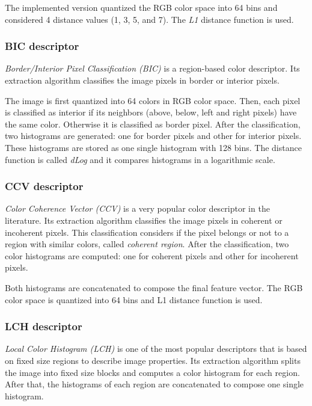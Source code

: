 The implemented version quantized the RGB color space into 64 bins and considered 4 distance values (1, 3, 5, and 7). The \emph{L1} distance function is used.

\subsubsection{BIC descriptor}

\emph{Border/Interior Pixel Classification (BIC)} \cite{stehling2002compact} is a region-based color descriptor. Its extraction algorithm classifies the image pixels in border or interior
pixels. 

The image is first quantized into 64 colors in RGB color space. Then, each pixel is classified as interior
if its neighbors (above, below, left and right pixels) have the same color. Otherwise it is classified as border pixel. After the classification, two histograms are generated: one for border pixels and other for interior pixels. These histograms are stored as one single histogram with 128 bins. The distance
function is called \emph{dLog} and it compares histograms in a logarithmic scale. 

\subsubsection{CCV descriptor}

\emph{Color Coherence Vector (CCV)} \cite{pass1997comparing} is a very popular color descriptor in the literature. Its extraction algorithm classifies the image pixels in coherent or incoherent pixels. This classification considers if the pixel belongs or not to a region with similar colors, called \emph{coherent region}. After the classification, two color histograms are computed: one for coherent pixels and other for incoherent pixels.

Both histograms are concatenated to compose the final feature vector. The RGB color space is quantized into 64 bins and L1 distance function is used.

\subsubsection{LCH descriptor}

\emph{Local Color Histogram (LCH)} \cite{swain1991color} is one of the most popular descriptors that is based on fixed size regions to describe image properties. Its extraction algorithm splits the image into fixed size blocks and computes a color histogram for each region. After that, the histograms of each region
are concatenated to compose one single histogram. 

